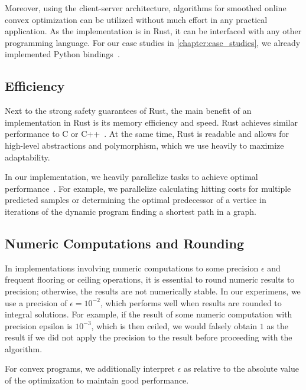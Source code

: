 Moreover, using the client-server architecture, algorithms for smoothed online convex optimization can be utilized without much effort in any practical application. As the implementation is in Rust, it can be interfaced with any other programming language. For our case studies in \cref{chapter:case_studies}, we already implemented Python bindings~\cite{Huebotter2021_3}.

\subsection{Efficiency}

Next to the strong safety guarantees of Rust, the main benefit of an implementation in Rust is its memory efficiency and speed. Rust achieves similar performance to C or C++~\cite{Benchmarksgame, Rust, Perkel2020}. At the same time, Rust is readable and allows for high-level abstractions and polymorphism, which we use heavily to maximize adaptability.

In our implementation, we heavily parallelize tasks to achieve optimal performance~\cite{Matsakis2015}. For example, we parallelize calculating hitting costs for multiple predicted samples or determining the optimal predecessor of a vertice in iterations of the dynamic program finding a shortest path in a graph.

\subsection{Numeric Computations and Rounding}

In implementations involving numeric computations to some precision $\epsilon$ and frequent flooring or ceiling operations, it is essential to round numeric results to precision; otherwise, the results are not numerically stable. In our experimens, we use a precision of $\epsilon = 10^{-2}$, which performs well when results are rounded to integral solutions. For example, if the result of some numeric computation with precision epsilon is $10^{-3}$, which is then ceiled, we would falsely obtain $1$ as the result if we did not apply the precision to the result before proceeding with the algorithm.

For convex programs, we additionally interpret $\epsilon$ as relative to the absolute value of the optimization to maintain good performance.